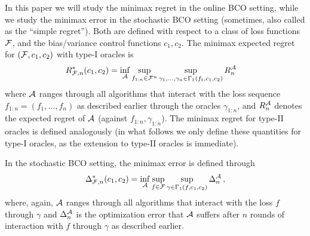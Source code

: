 In this paper we will study the minimax regret in the online BCO setting, while we study the minimax error in the stochastic BCO setting (sometimes, also called as the ``simple regret'').
Both are defined with respect to a class of loss functions $\mathcal{F}$, and the bias/variance control functions $c_1,c_2$.
The minimax expected regret for $(\mathcal{F},c_1,c_2)$ with type-I oracles is
\begin{align*}
R_{\F,n}^*(c_1,c_2)
&= \inf_{\cA} \sup_{f_{1:n}\in \cF^n}
	\sup_{\substack{\gamma_1,\ldots,\gamma_n \in \Gamma_1(f_t,c_1,c_2)%
	}} R_n^{\cA} %
\end{align*}
where $\mathcal{A}$ ranges through all algorithms that interact with the loss sequence  $f_{1:n}= (f_1,\dots,f_n)$
as described earlier
through the oracles $\gamma_{1:n}$,
and $R_n^{\mathcal{A}}$ denotes the expected regret of $\mathcal{A}$ (against $f_{1:n},\gamma_{1:n}$).
The minimax regret for type-II oracles is defined analogously (in what follows we only define these quantities for type-I oracles, as the extension to type-II oracles is immediate).

In the stochastic BCO setting, the minimax error is defined through
\begin{align}
\label{eq:minimaxerrdef}
\Delta_{\F,n}^*(c_1,c_2)
= \inf_{\cA} \sup_{f \in \cF} \sup_{\gamma\in \Gamma_1(f,c_1,c_2)}  \Delta_n^{\cA}\,, %
\end{align}
where, again, $\mathcal{A}$ ranges through all algorithms that interact with the loss $f$ through $\gamma$ and
$\Delta_n^{\mathcal{A}}$ is the optimization error that $\mathcal{A}$ suffers
after $n$ rounds of interaction with $f$ through $\gamma$ as described earlier.

